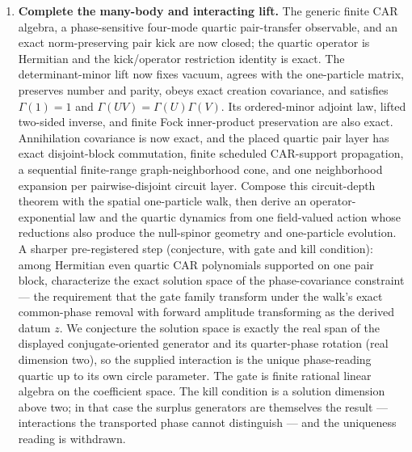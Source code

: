 \documentclass[11pt]{article}
\begin{document}
\begin{enumerate}[leftmargin=2em]
  kernel-checked impossibility: no translation-invariant index of the
  periodic extension, composed with any decoder, reproduces the
  positional certificate.  What remains open here is the general-length
  reduction: a finite index operator for the \emph{derived winding} on
  arbitrary registers, with a localized protected mode and a displayed
  stability class, and a theorem connecting it to the companion's
  positional data.
  \item \textbf{Complete the many-body and interacting lift.}
  The generic finite CAR algebra, a phase-sensitive four-mode quartic
  pair-transfer observable, and an exact norm-preserving pair kick are now
  closed; the quartic operator is Hermitian and the kick/operator restriction
  identity is exact.  The determinant-minor lift now fixes vacuum, agrees with
  the one-particle matrix, preserves number and parity, obeys exact creation
  covariance, and satisfies $\Gamma(1)=1$ and
  $\Gamma(UV)=\Gamma(U)\Gamma(V)$.  Its ordered-minor adjoint law, lifted
  two-sided inverse, and finite Fock inner-product preservation are also exact.
  Annihilation covariance is now exact, and the placed quartic pair layer has
  exact disjoint-block commutation, finite scheduled CAR-support propagation,
  a sequential finite-range graph-neighborhood cone, and one neighborhood
  expansion per pairwise-disjoint circuit layer.  Compose this circuit-depth
  theorem with the spatial one-particle walk, then derive an
  operator-exponential law and the quartic dynamics from one
  field-valued action whose reductions also produce the null-spinor geometry
  and one-particle evolution.
  A sharper pre-registered step (conjecture, with gate and kill
  condition): among Hermitian even quartic CAR polynomials supported on
  one pair block, characterize the exact solution space of the
  phase-covariance constraint --- the requirement that the gate family
  transform under the walk's exact common-phase removal with forward
  amplitude transforming as the derived datum $z$.  We conjecture the
  solution space is exactly the real span of the displayed
  conjugate-oriented generator and its quarter-phase rotation (real
  dimension two), so the supplied interaction is the unique
  phase-reading quartic up to its own circle parameter.  The gate is
  finite rational linear algebra on the coefficient space.  The kill
  condition is a solution dimension above two; in that case the surplus
  generators are themselves the result --- interactions the transported
  phase cannot distinguish --- and the uniqueness reading is withdrawn.

\end{enumerate}
\end{document}
